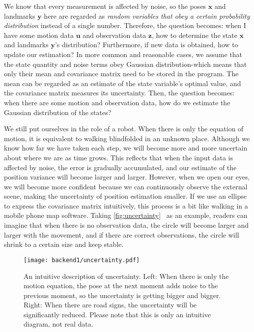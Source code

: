 We know that every measurement is affected by noise, so the poses $\mathbf{x}$ and landmarks $\mathbf{y}$ here are regarded as \textit{random variables that obey a certain probability distribution} instead of a single number. Therefore, the question becomes: when I have some motion data $\mathbf{u}$ and observation data $\mathbf{z}$, how to determine the state $\mathbf{x}$ and landmarks $\mathbf{y}$'s distribution? Furthermore, if new data is obtained, how to update our estimation? In more common and reasonable cases, we assume that the state quantity and noise terms obey Gaussian distribution-which means that only their mean and covariance matrix need to be stored in the program. The mean can be regarded as an estimate of the state variable's optimal value, and the covariance matrix measures its uncertainty. Then, the question becomes: when there are some motion and observation data, how do we estimate the Gaussian distribution of the states?

We still put ourselves in the role of a robot. When there is only the equation of motion, it is equivalent to walking blindfolded in an unknown place. Although we know how far we have taken each step, we will become more and more uncertain about where we are as time grows. This reflects that when the input data is affected by noise, the error is gradually accumulated, and our estimate of the position variance will become larger and larger. However, when we open our eyes, we will become more confident because we can continuously observe the external scene, making the uncertainty of position estimation smaller. If we use an ellipse to express the covariance matrix intuitively, this process is a bit like walking in a mobile phone map software. Taking \autoref{fig:uncertainty}~ as an example, readers can imagine that when there is no observation data, the circle will become larger and larger with the movement, and if there are correct observations, the circle will shrink to a certain size and keep stable.

\begin{figure}[!ht]
	\centering
	\texttt{[image: backend1/uncertainty.pdf]}
	\caption{An intuitive description of uncertainty. Left: When there is only the motion equation, the pose at the next moment adds noise to the previous moment, so the uncertainty is getting bigger and bigger. Right: When there are road signs, the uncertainty will be significantly reduced. Please note that this is only an intuitive diagram, not real data.}
	\label{fig:uncertainty}
\end{figure}

